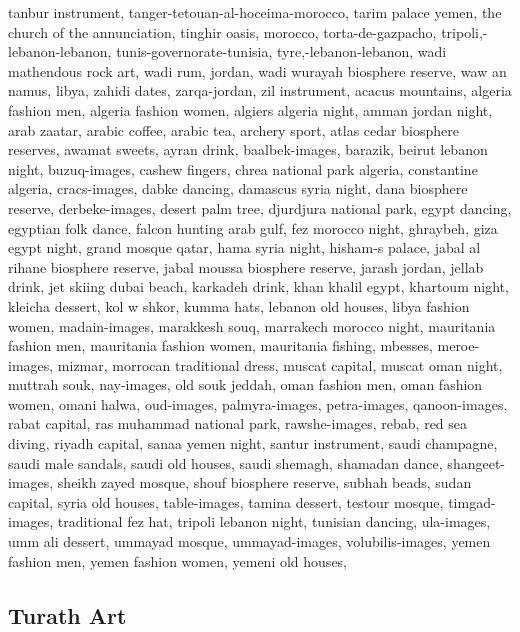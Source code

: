 \documentclass{article}
\begin{document}
tanbur instrument,
tanger-tetouan-al-hoceima-morocco,
tarim palace yemen,
the church of the annunciation,
tinghir oasis, morocco,
torta-de-gazpacho,
tripoli,-lebanon-lebanon,
tunis-governorate-tunisia,
tyre,-lebanon-lebanon,
wadi mathendous rock art,
wadi rum, jordan,
wadi wurayah biosphere reserve,
waw an namus, libya,
zahidi dates,
zarqa-jordan,
zil instrument,
acacus mountains,
algeria fashion men,
algeria fashion women,
algiers algeria night,
amman jordan night,
arab zaatar,
arabic coffee,
arabic tea,
archery sport,
atlas cedar biosphere reserves,
awamat sweets,
ayran drink,
baalbek-images,
barazik,
beirut lebanon night,
buzuq-images,
cashew fingers,
chrea national park algeria,
constantine algeria,
cracs-images,
dabke dancing,
damascus syria night,
dana biosphere reserve,
derbeke-images,
desert palm tree,
djurdjura national park,
egypt dancing,
egyptian folk dance,
falcon hunting arab gulf,
fez morocco night,
ghraybeh,
giza egypt night,
grand mosque qatar,
hama syria night,
hisham-s palace,
jabal al rihane biosphere reserve,
jabal moussa biosphere reserve,
jarash jordan,
jellab drink,
jet skiing dubai beach,
karkadeh drink,
khan khalil egypt,
khartoum night,
kleicha dessert,
kol w shkor,
kumma hats,
lebanon old houses,
libya fashion women,
madain-images,
marakkesh souq,
marrakech morocco night,
mauritania fashion men,
mauritania fashion women,
mauritania fishing,
mbesses,
meroe-images,
mizmar,
morrocan traditional dress,
muscat capital,
muscat oman night,
muttrah souk,
nay-images,
old souk jeddah,
oman fashion men,
oman fashion women,
omani halwa,
oud-images,
palmyra-images,
petra-images,
qanoon-images,
rabat capital,
ras muhammad national park,
rawshe-images,
rebab,
red sea diving,
riyadh capital,
sanaa yemen night,
santur instrument,
saudi champagne,
saudi male sandals,
saudi old houses,
saudi shemagh,
shamadan dance,
shangeet-images,
sheikh zayed mosque,
shouf biosphere reserve,
subhah beads,
sudan capital,
syria old houses,
table-images,
tamina dessert,
testour mosque,
timgad-images,
traditional fez hat,
tripoli lebanon night,
tunisian dancing,
ula-images,
umm ali dessert,
ummayad mosque,
ummayad-images,
volubilis-images,
yemen fashion men,
yemen fashion women,
yemeni old houses,

\subsection{Turath Art}
\end{document}
